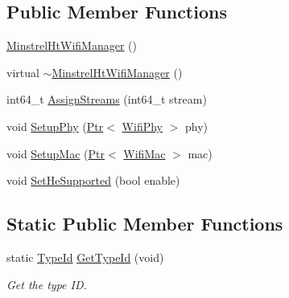 \subsection*{Public Member Functions}
\begin{DoxyCompactItemize}
\item 
\hyperlink{classns3_1_1MinstrelHtWifiManager_a02378c08b0b21f0d85c3e7611ce21aba}{Minstrel\+Ht\+Wifi\+Manager} ()
\item 
virtual \hyperlink{classns3_1_1MinstrelHtWifiManager_ae007b17cf3f980862291e4f1c1191dd3}{$\sim$\+Minstrel\+Ht\+Wifi\+Manager} ()
\item 
int64\+\_\+t \hyperlink{classns3_1_1MinstrelHtWifiManager_a657f1dd26cd9492287dff1f99284e7b8}{Assign\+Streams} (int64\+\_\+t stream)
\item 
void \hyperlink{classns3_1_1MinstrelHtWifiManager_a924e26c8c84e74234be8d978897f8ad3}{Setup\+Phy} (\hyperlink{classns3_1_1Ptr}{Ptr}$<$ \hyperlink{classns3_1_1WifiPhy}{Wifi\+Phy} $>$ phy)
\item 
void \hyperlink{classns3_1_1MinstrelHtWifiManager_abac95c9d370290c9afef68c1b70e8f15}{Setup\+Mac} (\hyperlink{classns3_1_1Ptr}{Ptr}$<$ \hyperlink{classns3_1_1WifiMac}{Wifi\+Mac} $>$ mac)
\item 
void \hyperlink{classns3_1_1MinstrelHtWifiManager_a948fb9923c8a0cb14d1102ab1cb57b87}{Set\+He\+Supported} (bool enable)
\end{DoxyCompactItemize}
\subsection*{Static Public Member Functions}
\begin{DoxyCompactItemize}
\item 
static \hyperlink{classns3_1_1TypeId}{Type\+Id} \hyperlink{classns3_1_1MinstrelHtWifiManager_aed9efdbc830840f0a381aa16cbe51256}{Get\+Type\+Id} (void)
\begin{DoxyCompactList}\small\item\em Get the type ID. \end{DoxyCompactList}\end{DoxyCompactItemize}
